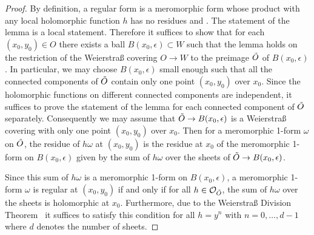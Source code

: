 \documentclass[11pt,twoside]{amsart}
\theoremstyle{plain}
\newcommand{\Sh}[1]{\mathcal{#1}} %
\newcommand{\dfx}{dx}
\begin{document}
\begin{proof}
By definition, a regular form is a meromorphic form whose product with any local holomorphic function $h$ has no residues \cite[Chapter~IV \S3]{Serre:88} and \cite{Rosenlicht:52}. The statement of the lemma is a local statement. Therefore it suffices to show that for each $(x_0,y_0)\in O$ there exists a ball $B(x_0,\epsilon)\subset W$ such that the lemma holds on the restriction of the Weierstra{\ss} covering $O\to W$ to the preimage $\Tilde{O}$ of $B(x_0,\epsilon)$. In particular, we may choose $B(x_0,\epsilon)$ small enough such that all the connected components of $\Tilde{O}$ contain only one point $(x_0,y_0)$ over $x_0$. Since the holomorphic functions on different connected components are independent, it suffices to prove the statement of the lemma for each connected component of $\Tilde{O}$ separately. Consequently we may assume that $\Tilde{O}\to B(x_0,\epsilon)$ is a Weierstra{\ss} covering with only one point $(x_0,y_0)$ over $x_0$. Then for a meromorphic 1-form $\omega$ on $\Tilde{O}$, the residue of $h\omega$ at $(x_0,y_0)$ is the residue at $x_0$ of the meromorphic 1-form on $B(x_0,\epsilon)$ given by the sum of $h\omega$ over the sheets of $\Tilde{O}\to B(x_0,\epsilon)$.

Since this sum of $h\omega$ is a meromorphic 1-form on $B(x_0,\epsilon)$, a meromorphic 1-form $\omega$ is regular at $(x_0,y_0)$ if and only if for all $h\in\Sh{O}_{\Tilde{O}}$, the sum of $h\omega$ over the sheets is holomorphic at $x_0$. Furthermore, due to the Weierstra{\ss} Division Theorem~\cite[Chapter I Theorem 1.1]{PR:94} it suffices to satisfy this condition for all $h=y^n$ with $n=0,\ldots,d-1$ where $d$ denotes the number of sheets.


\end{proof}
\end{document}
